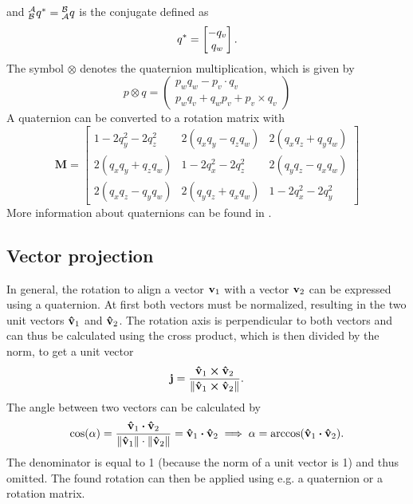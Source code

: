 and $\qtf{a}{b}^* = \qtf{b}{a}$ is the conjugate defined as
\begin{equation}
	\qtf{}{}^* = \begin{bmatrix}
		-q_v \\
		q_w
	\end{bmatrix}.
\end{equation}
The symbol $\otimes$ denotes the quaternion multiplication, which is given by
\begin{equation}
	p \otimes q=\left(\begin{array}{c}
			p_{w} q_{w}-p_v \cdot q_v \\
			p_{w} q_v+q_{w} p_v+p_v \times q_v
		\end{array}\right)
\end{equation}
A quaternion can be converted to a rotation matrix with
\begin{equation}
	\mathbf{M} =
	\left[
		\begin{array}{ccc}
			1 - 2q_y^2-2 q_z^2   & 2(q_x q_y- q_z q_w) & 2(q_x q_z + q_y q_w) \\
			2(q_x q_y + q_z q_w) & 1-2 q_x^2-2 q_z^2   & 2(q_y q_z -q_x q_w)  \\
			2(q_x q_z-q_y q_w)   & 2(q_y q_z+ q_x q_w) & 1 - 2 q_x^2- 2 q_y^2
		\end{array}
		\right]
\end{equation}
More information about quaternions can be found in \cite{Kok2017,Trawny2005}.\\

\subsection{Vector projection}
\label{subsec:vector_projection}
In general, the rotation to align a vector $\vb{v}_1$ with a vector $\vb{v}_2$ can be expressed using a quaternion.
At first both vectors must be normalized, resulting in the two unit vectors $\vu{v}_1$ and $\vu{v}_2$.
The rotation axis is perpendicular to both vectors and can thus be calculated using the cross product, which is then divided by the norm, to get a unit vector
\begin{equation}
	\vb{j} = \frac{\vu{v}_1 \cp \vu{v}_2}{\norm{\vu{v}_1 \cp \vu{v}_2}}.
\end{equation}
The angle between two vectors can be calculated by
\begin{equation}
	\cos(\alpha) = \frac{\vu{v}_1 \vdot \vu{v}_2}{\norm{\vu{v}_1} \cdot \norm{\vu{v}_2}}
	= \vu{v}_1 \vdot \vu{v}_2 \implies
	\alpha = \arccos(\vu{v}_1 \vdot \vu{v}_2).
\end{equation}
The denominator is equal to 1 (because the norm of a unit vector is 1) and thus omitted.
The found rotation can then be applied using e.g. a quaternion or a rotation matrix.



